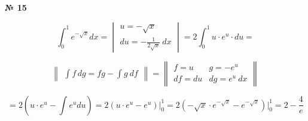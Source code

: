 \documentclass{article}
\begin{document}
\textbf{№ 15} 

$$ \int_{0}^{1} e^{-\sqrt{x}} dx 
= \begin{vmatrix} u = -\sqrt{x} \\
                 du = -\frac{1}{2\sqrt{x}} \ dx \end{vmatrix} 
= 2\int_{0}^{1} u \cdot e^{u} \cdot du 
= $$

$$ \begin{Vmatrix} \int f \,dg = fg - \int g \ df \end{Vmatrix} =
   \begin{Vmatrix} f = u &  g = -e^{u} \\
                  df = du & dg = e^{u} \ dx \end{Vmatrix} $$

$$ = 2 \left( u \cdot e^{u} - \int e^{u} du \right)
= 2 \left( u \cdot e^{u} - e^{u} \right) \bigg\vert_{0}^{1} 
= 2 \left( -\sqrt{x} \cdot e^{-\sqrt{x}} - e^{-\sqrt{x}} \right) \bigg\vert_{0}^{1}
= 2 - \frac{4}{e} $$
\end{document}

